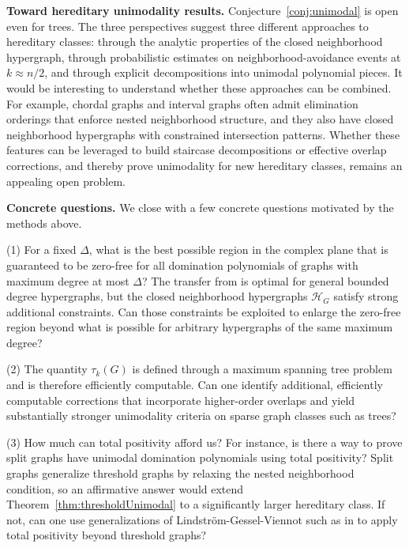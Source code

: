 \documentclass[11pt]{amsart}
\numberwithin{equation}{section}
\newcommand{\HH}{\mathcal{H}}
\begin{document}
\medskip\noindent
\textbf{Toward hereditary unimodality results.}
Conjecture~\ref{conj:unimodal} is open even for trees. The three perspectives suggest three different approaches to hereditary classes: through the analytic properties of the closed neighborhood hypergraph, through probabilistic estimates on neighborhood-avoidance events at $k\approx n/2$, and through explicit decompositions into unimodal polynomial pieces. It would be interesting to understand whether these approaches can be combined. For example, chordal graphs and interval graphs often admit elimination orderings that enforce nested neighborhood structure, and they also have closed neighborhood hypergraphs with constrained intersection patterns. Whether these features can be leveraged to build staircase decompositions or effective overlap corrections, and thereby prove unimodality for new hereditary classes, remains an appealing open problem.

\medskip\noindent
\textbf{Concrete questions.}
We close with a few concrete questions motivated by the methods above.

\smallskip\noindent
(1) For a fixed $\Delta$, what is the best possible region in the complex plane that is guaranteed to be zero-free for all domination polynomials of graphs with maximum degree at most $\Delta$? The transfer from \cite{BencsBuys2025} is optimal for general bounded degree hypergraphs, but the closed neighborhood hypergraphs $\HH_G$ satisfy strong additional constraints. Can those constraints be exploited to enlarge the zero-free region beyond what is possible for arbitrary hypergraphs of the same maximum degree?

\smallskip\noindent
(2) The quantity $\tau_k(G)$ is defined through a maximum spanning tree problem and is therefore efficiently computable. Can one identify additional, efficiently computable corrections that incorporate higher-order overlaps
and yield substantially stronger unimodality criteria on sparse graph classes such as trees?

\smallskip\noindent
(3) How much can total positivity afford us? For instance, is there a way to prove split graphs have unimodal domination polynomials using total positivity? Split graphs generalize threshold graphs by relaxing the nested neighborhood condition, so an affirmative answer would extend Theorem~\ref{thm:thresholdUnimodal} to a significantly larger hereditary class. If not, can one use generalizations of Lindstr\"{o}m-Gessel-Viennot such as in \cite{HopkinsZaimi2023} to apply total positivity beyond threshold graphs?
\end{document}

